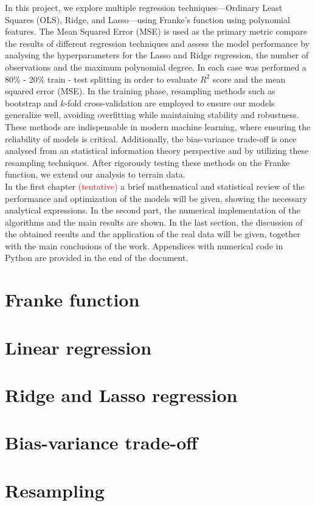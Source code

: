 \documentclass[11pt, letterpaper, titlepage]{article}
\begin{document}
\noindent
In this project, we explore multiple regression techniques—Ordinary Least Squares (OLS), Ridge, and Lasso—using Franke’s function using polynomial features. The Mean Squared Error (MSE)
is used as the primary metric compare the results of different regression techniques and assess the model performance by analysing the hyperparameters for the Lasso and Ridge regression, the number of observations and the maximum polynomial degree. In each case was performed a 80\% - 20\% train - test splitting in order to evaluate $R^2$ score and the mean squared error (MSE). In the training phase, resampling methods such as bootstrap and $k$-fold cross-validation are employed to ensure our models generalize well, avoiding overfitting while
maintaining stability and robustness. These methods are indispensable in modern machine learning, where ensuring the reliability of models is critical. Additionally, the bias-variance trade-off is once analysed from an statistical information theory perspective and by utilizing these resampling techniques. After rigorously testing these methods on the Franke function, we extend our analysis to terrain data. \\

\noindent
In the first chapter \textcolor{red}{(tentative)} a brief mathematical and statistical review of the performance and optimization of the models will be given, showing the necessary analytical expressions. In the second part, the numerical implementation of the algorithms and the main results are shown. In the last section, the discussion of the obtained results and the application of the real data will be given, together with the main conclusions of the work. Appendices with numerical code in Python are provided in the end of the document.
\section{Franke function}
\section{Linear regression}
\section{Ridge and Lasso regression}
\section{Bias-variance trade-off}
\section{Resampling}
\end{document}
